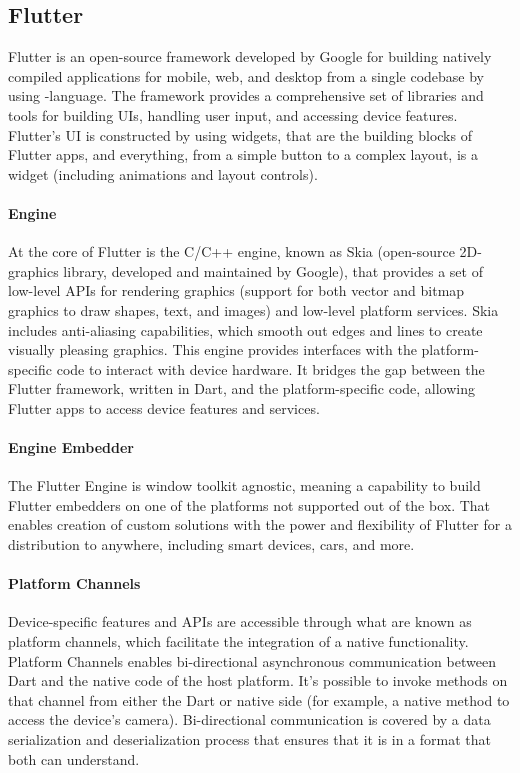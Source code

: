 
\subsection{Flutter}

Flutter is an open-source framework developed by Google for building natively compiled applications for mobile, web, and 
desktop from a single codebase by using -language. The framework provides a comprehensive set of libraries and 
tools for building UIs, handling user input, and accessing device features. Flutter's UI is constructed by using widgets, 
that are the building blocks of Flutter apps, and everything, from a simple button to a complex layout, is a widget
(including animations and layout controls).

\paragraph{Engine} At the core of Flutter is the C/C++ engine, known as Skia (open-source 2D-graphics library, developed 
and maintained by Google), that provides a set of low-level APIs for rendering graphics (support for both vector and 
bitmap graphics to draw shapes, text, and images) and low-level platform services. Skia includes anti-aliasing 
capabilities, which smooth out edges and lines to create visually pleasing graphics. This engine provides interfaces 
with the platform-specific code to interact with device hardware. It bridges the gap between the Flutter framework, 
written in Dart, and the platform-specific code, allowing Flutter apps to access device features and services.

\paragraph{Engine Embedder}

The Flutter Engine is window toolkit agnostic, meaning a capability to build Flutter embedders on one of the platforms 
not supported out of the box. That enables creation of custom solutions with the power and flexibility of Flutter for 
a distribution to anywhere, including smart devices, cars, and more.

\paragraph{Platform Channels} Device-specific features and APIs are accessible through what are known as platform channels, 
which facilitate the integration of a native functionality. Platform Channels enables bi-directional asynchronous 
communication between Dart and the native code of the host platform. It's possible to invoke methods on that channel 
from either the Dart or native side (for example, a native method to access the device's camera). Bi-directional 
communication is covered by a data serialization and deserialization process that ensures that it is in a format that 
both can understand.

